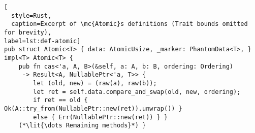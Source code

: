 \begin{lstlisting}[
  style=Rust,
  caption=Excerpt of \mc{Atomic}s definitions (Trait bounds omitted for brevity),
label=lst:def-atomic]
pub struct Atomic<T> { data: AtomicUsize, _marker: PhantomData<T>, }
impl<T> Atomic<T> {
    pub fn cas<'a, A, B>(&self, a: A, b: B, ordering: Ordering)
     -> Result<A, NullablePtr<'a, T>> {
        let (old, new) = (raw(a), raw(b));
        let ret = self.data.compare_and_swap(old, new, ordering);
        if ret == old { Ok(A::try_from(NullablePtr::new(ret)).unwrap()) }
        else { Err(NullablePtr::new(ret)) } }
    (*\lit{\dots Remaining methods}*) }
\end{lstlisting}
